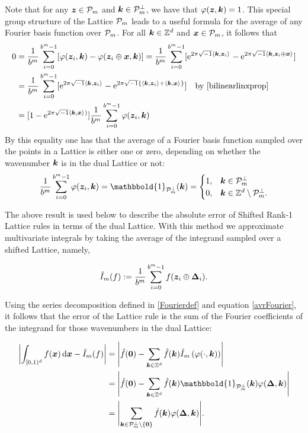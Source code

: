\documentclass[graybox]{svmult}
\newcommand{\Z}{\mathbb{Z}} %
\newcommand{\bszero}{\boldsymbol{0}} %
\newcommand{\bsx}{\boldsymbol{x}}    %
\newcommand{\bsz}{\boldsymbol{z}}    %
\newcommand{\bsDelta}{\boldsymbol{\Delta}}    %
\newcommand{\ind}{\mathbbold{1}}
\begin{document}
Note that for any $\bsz\in\cp_m$ and $\boldsymbol{k}\in\mathcal{P}_m^\perp$, we have that $\varphi(\bsz,\bsk)=1$. This special group structure of the Lattice $\mathcal{P}_m$ leads to a useful formula for the average of any Fourier basis function over $\mathcal{P}_m$. For all $\bsk \in \Z^d$ and $\bsx \in \cp_m$, it follows that
\begin{align*}
\nonumber
0 & = \frac{1}{b^m} \sum_{i=0}^{b^m-1} [\varphi(\bsz_i,\bsk) - \varphi(\bsz_i \oplus \bsx,\bsk)]
= \frac{1}{b^m} \sum_{i=0}^{b^m-1} [\E^{2 \pi \sqrt{-1} \ip{\bsk}{\bsz_i}} - \E^{2 \pi \sqrt{-1} \ip{\bsk}{\bsz_i \oplus \bsx}}]\\
\nonumber
& = \frac{1}{b^m} \sum_{i=0}^{b^m-1} [\E^{2 \pi \sqrt{-1} \ip{\bsk}{\bsz_i}} - \E^{2 \pi \sqrt{-1} \{\ip{\bsk}{\bsz_i}+\ip{\bsk}{\bsx}\}}] \quad \text{by } \eqref{bilinearlinxprop}\\
\label{sumeq}
& = [1 - \E^{2 \pi \sqrt{-1} \ip{\bsk}{\bsx})}] \frac{1}{b^m} \sum_{i=0}^{b^m-1} \varphi(\bsz_i,\bsk)
\end{align*}
By this equality one has that the average of a Fourier basis function sampled over the points in a Lattice is either one or zero, depending on whether the wavenumber $\boldsymbol{k}$ is in the dual Lattice or not:
\begin{equation}\label{avrFourier}
\frac{1}{b^m} \sum_{i=0}^{b^m-1} \varphi(\bsz_i,\bsk) = \ind_{\cp_m^{\perp}}(\bsk) = \begin{cases} 1 , & \bsk \in \cp_m^{\perp}\\
 0,  & \bsk \in \Z^d \setminus \cp_m^{\perp}.
 \end{cases}
\end{equation}

The above result is used below to describe the absolute error of Shifted Rank-1 Lattice rules in terms of the dual Lattice. With this method we approximate multivariate integrals by taking the average of the integrand sampled over a shifted Lattice, namely,

\begin{equation} \label{cubaturedef}
\hI_m(f) := \frac{1}{b^m} \sum_{i=0}^{b^m-1} f(\bsz_i \oplus\bsDelta_i).
\end{equation}

Using the series decomposition defined in \eqref{Fourierdef} and equation \eqref{avrFourier}, it follows that the error of the Lattice rule is the sum of the Fourier coefficients of the integrand for those wavenumbers in the dual Lattice:

\begin{align}
\nonumber
\biggabs{ \int_{\cube} f(\bsx) \, \D \bsx - \hI_m(f)} 
& = \Biggabs {\hf(\bszero) - \sum_{\bsk \in \Z^d} \hf(\bsk) \hI_m\left(\varphi(\cdot,\bsk)\right)} \\
\nonumber
& = \Biggabs {\hf(\bszero) - \sum_{\bsk \in \Z^d} \hf(\bsk) \ind_{\cp_m^{\perp}}(\bsk) \varphi(\bsDelta,\bsk)} \\ 
& = \Biggabs {\sum_{\bsk \in \cp_m^{\perp}\setminus \{\bszero\} } \hf(\bsk)  \varphi(\bsDelta,\bsk)}. \label{err1}
\end{align}
\end{document}
